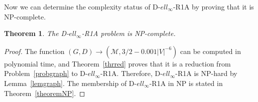 \documentclass[a4paper,11pt]{article}
\newtheorem{theorem}{Theorem}
\numberwithin{equation}{section}
\begin{document}
Now we can determine the complexity status of D-$ell_\infty$-R1A by proving that it is NP-complete.

\begin{theorem}\label{thrnpcom}
The D-$ell_\infty$-R1A problem is NP-complete.
\end{theorem}

\begin{proof}
The function $(G,D)\to(\mathcal{M},3/2-0.001|V|^{-6})$ can be computed in polynomial time, and Theorem~\ref{thrred} proves that it is a reduction from Problem~\ref{probgraph} to D-$ell_\infty$-R1A. Therefore, D-$ell_\infty$-R1A is NP-hard by Lemma~\ref{lemgraph}. The membership of D-$ell_\infty$-R1A in NP is stated in Theorem~\ref{theoremNP}. 
\end{proof}



%
\end{document}
